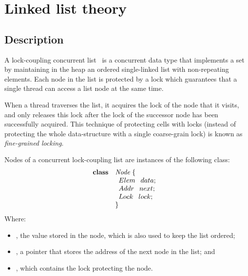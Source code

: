 






\section{Linked list theory}

\subsection{Description}

\begin{defn}
A lock-coupling concurrent list~\cite{herlihy08art,vafeiadis06proving} is 
a concurrent data type that implements a set by maintaining in the heap an 
ordered single-linked list with non-repeating elements.
%
Each node in the list is protected by a lock which guarantees that a 
single thread can access a list node at the same time.
%
\end{defn}

When a thread traverses the list, it acquires the lock of the node
that it visits, and only releases this lock after the lock of the
successor node has been successfully acquired.
%
This technique of protecting cells with locks (instead of protecting
the whole data-structure with a single coarse-grain lock) is known as
\emph{fine-grained locking}.

%
Nodes of a concurrent lock-coupling list are instances of the following 
\ListNode class:
%
\[
  \begin{array}{ll}
	  \textbf{class} & \mathit{Node}  \;\{\\
	  		&\begin{array}{l}
				Elem \:\;\; data; \;\\
				Addr \:\;\; next; \;\\
				Lock \:\;\; lock; \;
			\end{array}\\
		&\}
  \end{array}
\]
%
Where:
\begin{itemize}
		\item \fData, the value stored in the node, which is also used to keep 
			the list ordered;
		\item \fNext, a pointer that stores the address of the next node in 
			the list; and
		\item \fLock, which contains the lock protecting the node.
\end{itemize}

